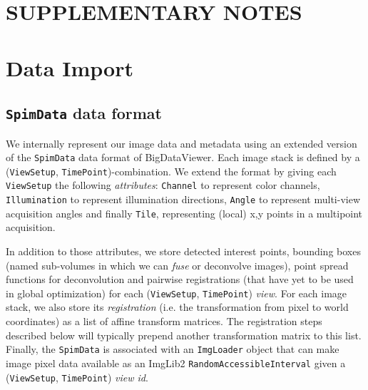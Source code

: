 \section*{SUPPLEMENTARY NOTES}

\hspace{20mm}

\section{Data Import}
\label{sec:sup-note1}

\subsection*{\texttt{SpimData} data format}

We internally represent our image data and metadata using an extended version of the \texttt{SpimData} data format of BigDataViewer\cite{pietzsch2015bigdataviewer}. Each image stack is defined by a (\texttt{ViewSetup}, \texttt{TimePoint})-combination. We extend the format by giving each \texttt{ViewSetup} the following \emph{attributes}: \texttt{Channel} to represent color channels, \texttt{Illumination} to represent illumination directions, \texttt{Angle} to represent multi-view acquisition angles and finally \texttt{Tile}, representing (local) x,y points in a multipoint acquisition.

In addition to those attributes, we store detected interest points, bounding boxes (named sub-volumes in which we can \emph{fuse} or deconvolve images), point spread functions for deconvolution and pairwise registrations (that have yet to be used in global optimization) for each (\texttt{ViewSetup}, \texttt{TimePoint}) \emph{view}. For each image stack, we also store its \emph{registration} (i.e. the transformation from pixel to world coordinates) as a list of affine transform matrices. The registration steps described below will typically prepend another transformation matrix to this list. Finally, the \texttt{SpimData} is associated with an \texttt{ImgLoader} object that can make image pixel data available as an ImgLib2 \cite{imglib2} \texttt{RandomAccessibleInterval} given a  (\texttt{ViewSetup}, \texttt{TimePoint}) \emph{view id}.

